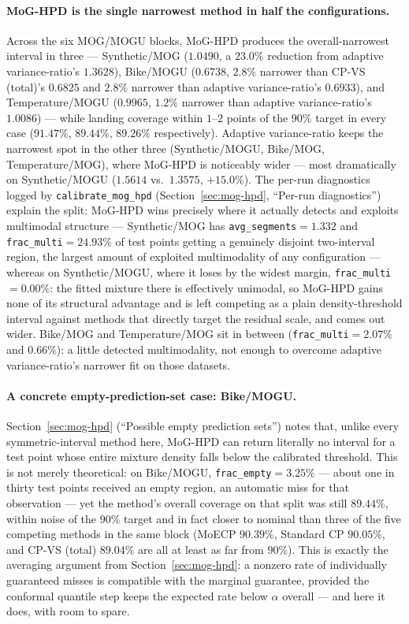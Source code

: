 \documentclass[11pt]{article}
\begin{document}
\paragraph{MoG-HPD is the single narrowest method in half the configurations.} Across the six
MOG/MOGU blocks, MoG-HPD produces the overall-narrowest interval in three — Synthetic/MOG
($1.0490$, a $23.0\%$ reduction from adaptive variance-ratio's $1.3628$), Bike/MOGU ($0.6738$,
$2.8\%$ narrower than CP-VS (total)'s $0.6825$ and $2.8\%$ narrower than adaptive
variance-ratio's $0.6933$), and Temperature/MOGU ($0.9965$, $1.2\%$ narrower than adaptive
variance-ratio's $1.0086$) — while landing coverage within $1$–$2$ points of the $90\%$ target in
every case ($91.47\%$, $89.44\%$, $89.26\%$ respectively). Adaptive variance-ratio keeps the
narrowest spot in the other three (Synthetic/MOGU, Bike/MOG, Temperature/MOG), where MoG-HPD is
noticeably wider — most dramatically on Synthetic/MOGU ($1.5614$ vs.\ $1.3575$, $+15.0\%$). The
per-run diagnostics logged by \texttt{calibrate\_mog\_hpd} (Section~\ref{sec:mog-hpd}, ``Per-run
diagnostics'')
explain the split: MoG-HPD wins precisely where it actually detects and exploits multimodal
structure — Synthetic/MOG has \texttt{avg\_segments}$=1.332$ and \texttt{frac\_multi}$=24.93\%$
of test points getting a genuinely disjoint two-interval region, the largest amount of exploited
multimodality of any configuration — whereas on Synthetic/MOGU, where it loses by the widest
margin, \texttt{frac\_multi}$=0.00\%$: the fitted mixture there is effectively unimodal, so
MoG-HPD gains none of its structural advantage and is left competing as a plain
density-threshold interval against methods that directly target the residual scale, and comes
out wider. Bike/MOG and Temperature/MOG sit in between (\texttt{frac\_multi}$=2.07\%$ and
$0.66\%$): a little detected multimodality, not enough to overcome adaptive variance-ratio's
narrower fit on those datasets.

\paragraph{A concrete empty-prediction-set case: Bike/MOGU.} Section~\ref{sec:mog-hpd} (``Possible
empty
prediction sets'') notes that, unlike every symmetric-interval method here, MoG-HPD can return
literally no interval for a test point whose entire mixture density falls below the calibrated
threshold. This is not merely theoretical: on Bike/MOGU, \texttt{frac\_empty}$=3.25\%$ — about
one in thirty test points received an empty region, an automatic miss for that observation — yet
the method's overall coverage on that split was still $89.44\%$, within noise of the $90\%$
target and in fact closer to nominal than three of the five competing methods in the same block
(MoECP $90.39\%$, Standard CP $90.05\%$, and CP-VS (total) $89.04\%$ are all at least as far from
$90\%$). This is exactly the averaging argument from Section~\ref{sec:mog-hpd}: a nonzero rate of
individually
guaranteed misses is compatible with the marginal guarantee, provided the conformal quantile step
keeps the expected rate below $\alpha$ overall — and here it does, with room to spare.
\end{document}
